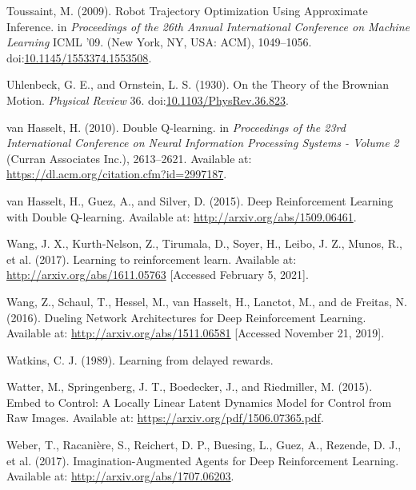 \documentclass[
  letterpaper,
  DIV=11,
  numbers=noendperiod]{scrreprt}
\newlength{\cslhangindent}
\newlength{\cslentryspacingunit} %
\newenvironment{CSLReferences}[2] %
 {%
  \setlength{\parindent}{0pt}
  \ifodd #1
  \let\oldpar\par
  \def\par{\hangindent=\cslhangindent\oldpar}
  \fi
  \setlength{\parskip}{#2\cslentryspacingunit}
 }%
 {}
\begin{document}
\begin{CSLReferences}{1}{0}
\leavevmode{}%
Toussaint, M. (2009). Robot {Trajectory Optimization Using Approximate
Inference}. in \emph{Proceedings of the 26th {Annual International
Conference} on {Machine Learning}} {ICML} '09. ({New York, NY, USA}:
{ACM}), 1049--1056.
doi:\href{https://doi.org/10.1145/1553374.1553508}{10.1145/1553374.1553508}.

\leavevmode{}%
Uhlenbeck, G. E., and Ornstein, L. S. (1930). On the {Theory} of the
{Brownian Motion}. \emph{Physical Review} 36.
doi:\href{https://doi.org/10.1103/PhysRev.36.823}{10.1103/PhysRev.36.823}.

\leavevmode{}%
van Hasselt, H. (2010). Double {Q-learning}. in \emph{Proceedings of the
23rd {International Conference} on {Neural Information Processing
Systems} - {Volume} 2} ({Curran Associates Inc.}), 2613--2621. Available
at: \url{https://dl.acm.org/citation.cfm?id=2997187}.

\leavevmode{}%
van Hasselt, H., Guez, A., and Silver, D. (2015). Deep {Reinforcement
Learning} with {Double Q-learning}. Available at:
\url{http://arxiv.org/abs/1509.06461}.

\leavevmode{}%
Wang, J. X., Kurth-Nelson, Z., Tirumala, D., Soyer, H., Leibo, J. Z.,
Munos, R., et al. (2017). Learning to reinforcement learn. Available at:
\url{http://arxiv.org/abs/1611.05763} {[}Accessed February 5, 2021{]}.

\leavevmode{}%
Wang, Z., Schaul, T., Hessel, M., van Hasselt, H., Lanctot, M., and de
Freitas, N. (2016). Dueling {Network Architectures} for {Deep
Reinforcement Learning}. Available at:
\url{http://arxiv.org/abs/1511.06581} {[}Accessed November 21, 2019{]}.

\leavevmode{}%
Watkins, C. J. (1989). Learning from delayed rewards.

\leavevmode{}%
Watter, M., Springenberg, J. T., Boedecker, J., and Riedmiller, M.
(2015). Embed to {Control}: {A Locally Linear Latent Dynamics Model} for
{Control} from {Raw Images}. Available at:
\url{https://arxiv.org/pdf/1506.07365.pdf}.

\leavevmode{}%
Weber, T., Racanière, S., Reichert, D. P., Buesing, L., Guez, A.,
Rezende, D. J., et al. (2017). Imagination-{Augmented Agents} for {Deep
Reinforcement Learning}. Available at:
\url{http://arxiv.org/abs/1707.06203}.


\end{CSLReferences}
\end{document}
